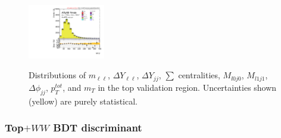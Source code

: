 \begin{figure}[!h]
{      \includegraphics[width=0.3\textwidth]{Pictures/run2-emme-CutVBFTopControl_2jetinclZttVeto-Ml1j1-lin.pdf}
  }\hfill
  \hfill
  \hfill
{\caption{Distributions of $m_{\ell\ell}$, $\Delta Y_{\ell\ell}$, $\Delta Y_{jj}$, $\sum$ centralities, $M_{l0j0}$, $M_{l1j1}$, $\Delta\phi_{jj}$, $p_T^{tot}$, and $m_T$ in the top validation region. Uncertainties shown (yellow) are purely statistical.
\label{fig:TopCR3}}}
\end{figure}

\subsubsection{Top$+WW$ BDT discriminant}

